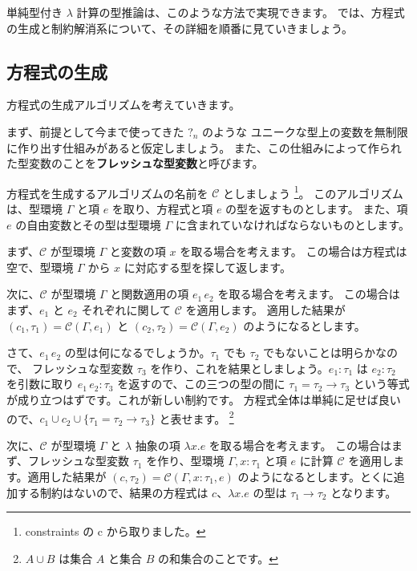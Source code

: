 単純型付き $\lambda$ 計算の型推論は、このような方法で実現できます。
では、方程式の生成と制約解消系について、その詳細を順番に見ていきましょう。

\subsection{方程式の生成}

方程式の生成アルゴリズムを考えていきます。

まず、前提として今まで使ってきた $?_n$ のような
ユニークな型上の変数を無制限に作り出す仕組みがあると仮定しましょう。
また、この仕組みによって作られた型変数のことを\textbf{フレッシュな型変数}と呼びます。

方程式を生成するアルゴリズムの名前を $\mathcal C$ としましょう
\footnote{constraints の c から取りました。}。
このアルゴリズムは、型環境 $\Gamma$ と項 $e$ を取り、方程式と項 $e$ の型を返すものとします。
また、項 $e$ の自由変数とその型は型環境 $\Gamma$ に含まれていなければならないものとします。

まず、$\mathcal C$ が型環境 $\Gamma$ と変数の項 $x$ を取る場合を考えます。
この場合は方程式は空で、型環境 $\Gamma$ から $x$ に対応する型を探して返します。

次に、$\mathcal C$ が型環境 $\Gamma$ と関数適用の項 $e_1 \, e_2$ を取る場合を考えます。
この場合はまず、$e_1$ と $e_2$ それぞれに関して $\mathcal C$ を適用します。
適用した結果が $(c_1, \tau_1) = \mathcal{C}(\Gamma, e_1)$ と
$(c_2, \tau_2) = \mathcal{C}(\Gamma, e_2)$ のようになるとします。

さて、$e_1 \, e_2$ の型は何になるでしょうか。$\tau_1$ でも $\tau_2$ でもないことは明らかなので、
フレッシュな型変数 $\tau_3$ を作り、これを結果としましょう。$e_1 : \tau_1$ は $e_2 : \tau_2$
を引数に取り $e_1 \, e_2 : \tau_3$ を返すので、この三つの型の間に $\tau_1 = \tau_2 \to \tau_3$
という等式が成り立つはずです。これが新しい制約です。
方程式全体は単純に足せば良いので、$c_1 \cup c_2 \cup \{\tau_1 = \tau_2 \to \tau_3\}$ と表せます。
\footnote{$A \cup B$ は集合 $A$ と集合 $B$ の和集合のことです。}

次に、$\mathcal C$ が型環境 $\Gamma$ と $\lambda$ 抽象の項 $\lambda x . e$ を取る場合を考えます。
この場合はまず、フレッシュな型変数 $\tau_1$ を作り、型環境 $\Gamma, x : \tau_1$ と項 $e$ に計算
$\mathcal C$ を適用します。適用した結果が $(c, \tau_2) = \mathcal{C}(\Gamma, x : \tau_1, e)$
のようになるとします。とくに追加する制約はないので、結果の方程式は $c$、$\lambda x . e$ の型は
$\tau_1 \to \tau_2$ となります。

